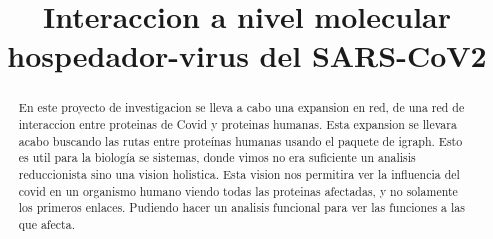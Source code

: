 \documentclass{bmcart}
\begin{document}
	\begin{frontmatter}
	
		\begin{fmbox}
			
			
			\title{Interaccion a nivel molecular hospedador-virus del SARS-CoV2}
			
			
			\author[
			  addressref={aff1},                   %
			  corref={aff1},                       %
			  email={emanuelamariastoia@gmail.com}   %
			]{ } %
			\author[
			  addressref={aff1},
			  email={joseantoniomr99@gmail.com}
			]{ }
			\author[
			  addressref={aff1},
			  email={stephancharles1999@yahoo.es}
			]{ }
			
			
			\address[id=aff1]{%
			  ,             %
			  ,          %
			  ,                              %
			}
		
		\end{fmbox}%
		
		\begin{abstractbox}
		
			\begin{abstract} %
			
			
			En este proyecto de investigacion se lleva a cabo una expansion en red, de una red de interaccion entre proteinas de Covid y proteinas 				humanas. 
			Esta expansion se llevara acabo buscando las rutas entre proteínas humanas usando el paquete de igraph. Esto es util para la 					biología se sistemas, donde vimos no era suficiente un analisis reduccionista sino una vision holistica.
			Esta vision nos permitira ver la influencia del covid en un organismo humano viendo todas las proteinas afectadas, y no solamente los 				primeros enlaces. Pudiendo hacer un analisis funcional para ver las funciones a las que afecta. 
			

\end{abstract}
\end{abstractbox}
\end{frontmatter}
\end{document}
